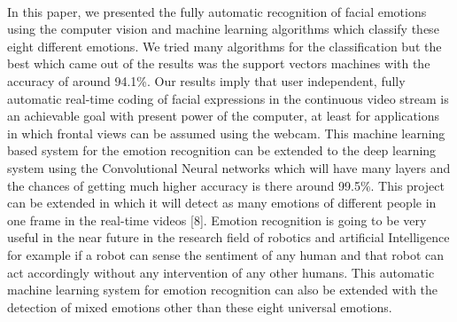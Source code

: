 \documentclass[a4paper,12pt,oneside]{article}
\begin{document}
\paragraph{}
In this paper, we presented the fully automatic
recognition of facial emotions using the computer vision
and machine learning algorithms which classify these
eight different emotions. We tried many algorithms for
the classification but the best which came out of the
results was the support vectors machines with the
accuracy of around 94.1\%. Our results imply that user
independent, fully automatic real-time coding of facial
expressions in the continuous video stream is an
achievable goal with present power of the computer, at
least for applications in which frontal views can be
assumed using the webcam. This machine learning based
system for the emotion recognition can be extended to
the deep learning system using the Convolutional Neural
networks which will have many layers and the chances
of getting much higher accuracy is there around 99.5\%. This project can be extended in which it will detect
as many emotions of different people in one frame in the
real-time videos [8]. Emotion recognition is going to be
very useful in the near future in the research field of
robotics and artificial Intelligence for example if a robot
can sense the sentiment of any human and that robot can
act accordingly without any intervention of any other
humans. This automatic machine learning system for
emotion recognition can also be extended with the
detection of mixed emotions other than these eight
universal emotions.


\newpage
\end{document}
